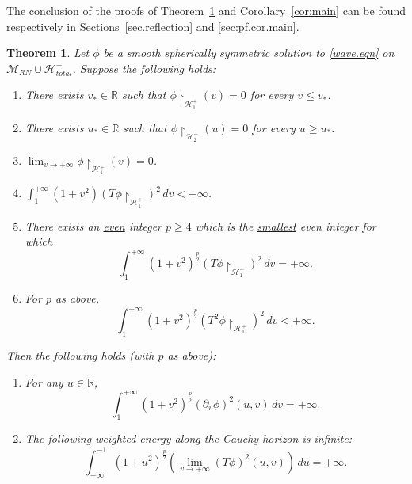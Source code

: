 \documentclass[10pt, reqno]{amsart}
\newtheorem{theorem}{Theorem}[section]
\theoremstyle{definition}
\theoremstyle{remark}
\numberwithin{equation}{section}
\newcommand{\rd}{\partial}
\newcommand{\0}{\emptyset}
\newcommand{\calH}{\mathcal H}
\newcommand{\f}{\frac}
\newcommand{\EH}{\calH^{+}}
\begin{document}
The conclusion of the proofs of Theorem~\ref{thm:main} and Corollary~\ref{cor:main} can be found respectively in Sections~\ref{sec.reflection} and \ref{sec:pf.cor.main}.


\begin{theorem}\label{thm:main}
Let $\phi$ be a smooth spherically symmetric solution to \eqref{wave.eqn} on $\mathcal M_{RN} \cup \mathcal H_{total}^+$. Suppose the following holds:
\begin{enumerate}
\item There exists $v_*\in \mathbb R$ such that $\phi\restriction_{\EH_1}(v) = 0$ for every $v\leq v_*$.
\item There exists $u_*\in \mathbb R$ such that $\phi \restriction_{\EH_2}(u) = 0$ for every $u \geq u_*$.
\item $\lim_{v\to +\infty} \phi\restriction_{\EH_1}(v) = 0$.
\item $\int_1^{+\infty} (1+v^2) (T\phi \restriction_{\EH_1})^2\, dv <+\infty$.
\item There exists an \underline{even} integer $p \geq 4$ which is the \underline{smallest} even integer for which
\begin{equation}\label{linear.lower.bd}
\int_1^{+\infty} (1+v^2)^{\f p2} (T\phi\restriction_{\EH_1})^2 \, dv = +\infty.
\end{equation}
\item For $p$ as above, 
\begin{equation}\label{imp.decay}
\int_1^{+\infty} (1+v^2)^{\f p2} (T^2\phi \restriction_{\EH_1})^2\, dv <+\infty.
\end{equation}
\end{enumerate}


Then the following holds (with $p$ as above):
\begin{enumerate}
\item For any $u\in \mathbb R$,
\begin{equation}\label{eq:main.instab.conclu}
\int_{1}^{+\infty} (1+v^2)^{\f p 2}(\rd_v\phi)^2(u,v)\, dv =+\infty.
\end{equation}
\item The following weighted energy along the Cauchy horizon is infinite: 
\begin{equation}\label{eq:main.CH.conclu}
\int_{-\infty}^{-1} (1+ u^2)^{\f p 2}(\lim_{v\to+\infty}(T\phi)^2(u,v))\, du =+\infty.
\end{equation}
\end{enumerate}
\end{theorem}
\end{document}

